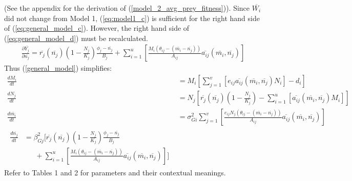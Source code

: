 \documentclass{amsart}
\theoremstyle{definition}
\theoremstyle{remark}
\numberwithin{equation}{section}
\begin{document}
(See the appendix for the derivation of (\ref{model_2_avg_prey_fitness})).  Since $\overline{W_i}$ did not change from Model 1, (\ref{eq:model1_c}) is sufficient for the right hand side of (\ref{eq:general_model_c}).  However, the right hand side of (\ref{eq:general_model_d}) must be recalculated.
\begin{equation}
	\label{model_2_prey_fitness_partial}
	\begin{aligned}
		\frac{\partial \overline{Y_j}}{\partial \overline{n_j}} = \overline{r_j}(\overline{n_j})\left(1 - \frac{N_j}{K_j}\right)\frac{\phi_j - \overline{n_j}}{B_j} + \sum\limits_{i = 1}^{u}\left[\frac{M_i(\theta_{ij} - (\overline{m_i} - \overline{n_j}))}{A_{ij}}\overline{a_{ij}}(\overline{m_i}, \overline{n_j})\right]
	\end{aligned}
\end{equation}
Thus (\ref{general_model}) simplifies:
\begin{subequations}
	\label{model2}
	\begin{align}
		\label{eq:model2_a}
		\frac{dM_i}{dt} &= M_i\left[\sum\limits_{j = 1}^{v}\left[e_{ij}\overline{a_{ij}}(\overline{m_i}, \overline{n_j})N_i\right] - d_i\right] \\[5px]
		\label{eq:model2_b}
		\frac{dN_j}{dt} &= N_j\left[\overline{r_j}(\overline{n_j})\left(1 - \frac{N_j}{K_j}\right) - \sum\limits_{i = 1}^{u}\left[\overline{a_{ij}}(\overline{m_i}, \overline{n_j})M_i\right]\right] \\[5px]
		\label{eq:model2_c}
		\frac{d\overline{m_i}}{dt} &= \sigma_{Gi}^2\sum\limits_{j = 1}^{v}\left[\frac{e_{ij}N_j(\theta_{ij} - (\overline{m_i} - \overline{n_j}))}{A_{ij}}\overline{a_{ij}}(\overline{m_i}, \overline{n_j})\right] \\[5px]
		\label{eq:model2_d}
		\begin{split}
			\frac{d\overline{n_j}}{dt} &= \beta_{Gj}^2\Bigg[\overline{r_j}(\overline{n_j})\left(1 - \frac{N_j}{K_j}\right)\frac{\phi_j - \overline{n_j}}{B_j} \\
			&\ \ \ \ \ \ \ + \sum\limits_{i = 1}^{u}\left[\frac{M_i(\theta_{ij} - (\overline{m_i} - \overline{n_j}))}{A_{ij}}\overline{a_{ij}}(\overline{m_i}, \overline{n_j})\right]\Bigg]
		\end{split}
	\end{align}
\end{subequations}
Refer to Tables 1 and 2 for parameters and their contextual meanings.
\end{document}

